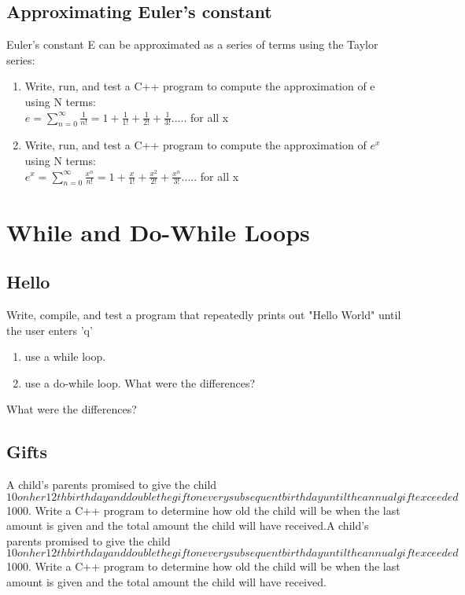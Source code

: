 \documentclass{article}
\begin{document}
\subsection{Approximating Euler's constant}
Euler's constant E can be approximated as a series of terms using the Taylor series:\\

\begin{enumerate}

\item Write, run, and test a C++ program to compute the approximation of e using N terms:\\
$e = \displaystyle \sum^{\infty  }_{n=0}\frac{1}{n!} = 1 + \frac{1}{1!} + \frac{1}{2!} + \frac{1}{3!} .....$ for all x
\item Write, run, and test a C++ program to compute the approximation of $e^{x}$ using N terms:\\
$e^{x}=\displaystyle \sum^{\infty}_{n=0}\frac{x^{n}}{n!} = 1 + \frac{x}{1!} + \frac{x^{2}}{2!} + \frac{x^{n}}{3!}.....$ for all x
\end{enumerate}

\section{While and Do-While Loops}

\subsection{Hello}
Write, compile, and test a program that repeatedly prints out "Hello World" until the user enters 'q'
\begin{enumerate}
	\item use a while loop.
	\item use a do-while loop. What were the differences?
\end{enumerate}
 What were the differences?

\subsection{Gifts}
A child’s parents promised to give the child $10 on her 12th birthday and double the gift on every subsequent birthday until the annual gift exceeded $1000. Write a C++ program to determine how old the child will be when the last amount is given and the total amount the child will have received.A child’s parents promised to give the child $10 on her 12th birthday and double the gift on every subsequent birthday until the annual gift exceeded $1000. Write a C++ program to determine how old the child will be when the last amount is given and the total amount the child will have received.
\end{document}
